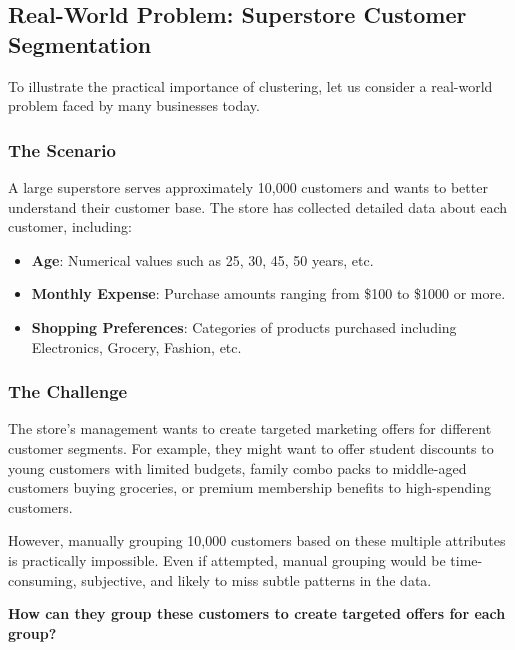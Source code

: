 \documentclass{article}
\begin{document}
\subsection{Real-World Problem: Superstore Customer Segmentation}

To illustrate the practical importance of clustering, let us consider a real-world problem faced by many businesses today.

\subsubsection{The Scenario}

A large superstore serves approximately 10,000 customers and wants to better understand their customer base. The store has collected detailed data about each customer, including:

\begin{itemize}
    \item \textbf{Age}: Numerical values such as 25, 30, 45, 50 years, etc.
    \item \textbf{Monthly Expense}: Purchase amounts ranging from \$100 to \$1000 or more.
    \item \textbf{Shopping Preferences}: Categories of products purchased including Electronics, Grocery, Fashion, etc.
\end{itemize}

\subsubsection{The Challenge}

The store's management wants to create targeted marketing offers for different customer segments. For example, they might want to offer student discounts to young customers with limited budgets, family combo packs to middle-aged customers buying groceries, or premium membership benefits to high-spending customers.

However, manually grouping 10,000 customers based on these multiple attributes is practically impossible. Even if attempted, manual grouping would be time-consuming, subjective, and likely to miss subtle patterns in the data.

\begin{tcolorbox}[title=The Central Question]
\centering
\Large
\textbf{How can they group these customers to create targeted offers for each group?}
\end{tcolorbox}
\end{document}
